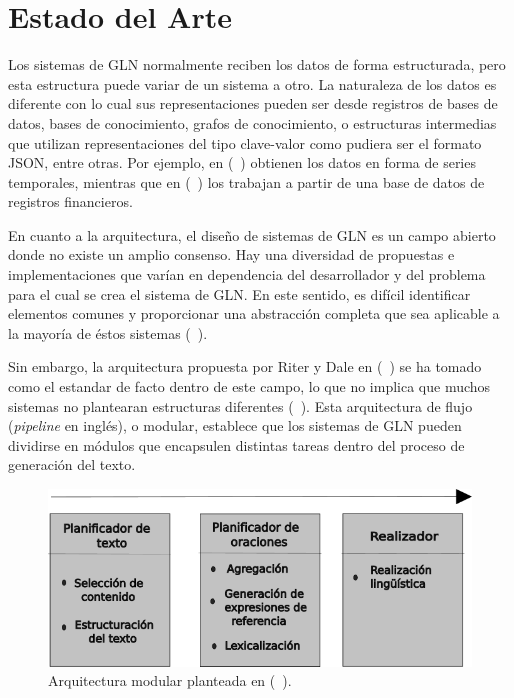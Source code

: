 \chapter{Estado del Arte}\label{chapter:state-of-the-art}


    Los sistemas de GLN normalmente reciben los datos de forma estructurada, pero esta estructura puede variar de un sistema a otro.
La naturaleza de los datos es diferente con lo cual sus representaciones pueden ser desde registros de bases de datos, bases de conocimiento, 
grafos de conocimiento, o estructuras intermedias que utilizan representaciones del tipo clave-valor como pudiera ser el formato JSON, entre otras. 
Por ejemplo, en (~\cite{Yu2006ChoosingTC}) obtienen los datos en forma de series temporales, mientras que en (~\cite{kukich1983design}) los trabajan a 
partir de una base de datos de registros financieros.

En cuanto a la arquitectura, el diseño de sistemas de GLN es un campo abierto donde no existe un amplio consenso. Hay una diversidad de propuestas e implementaciones 
que varían en dependencia del desarrollador y del problema para el cual se crea el sistema de GLN. En este sentido, es difícil identificar elementos comunes y proporcionar una abstracción 
completa que sea aplicable a la mayoría de éstos sistemas (~\cite{ramos2016role}).


 Sin embargo, la arquitectura propuesta por Riter y Dale en (~\cite{Reiter1997BuildingAN}) se ha tomado como el estandar de facto 
dentro de este campo, lo que no implica que muchos sistemas no plantearan estructuras diferentes (~\cite{Perera2017RecentAI}). 
Esta arquitectura de flujo (\emph{pipeline} en inglés), o modular, establece que los sistemas de GLN pueden dividirse en módulos 
que encapsulen distintas tareas dentro del proceso de generación del texto.

    

    \begin{figure}[!]
        \begin{center}
            \includegraphics[width=\textwidth]{Graphics/arquitecturaPipeline_Capa 1.png}
        \end{center}
        \caption{Arquitectura modular planteada en (~\cite{Reiter1997BuildingAN}).}
        \label{fig_arq_Pipeline}
    \end{figure}


